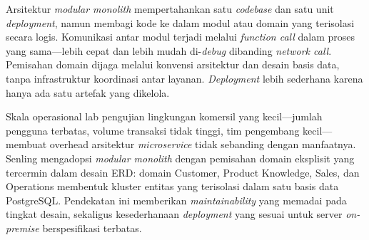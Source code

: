 Arsitektur \textit{modular monolith} mempertahankan satu \textit{codebase} dan satu unit \textit{deployment}, namun membagi kode ke dalam modul atau domain yang terisolasi secara logis. Komunikasi antar modul terjadi melalui \textit{function call} dalam proses yang sama—lebih cepat dan lebih mudah di-\textit{debug} dibanding \textit{network call}. Pemisahan domain dijaga melalui konvensi arsitektur dan desain basis data, tanpa infrastruktur koordinasi antar layanan. \textit{Deployment} lebih sederhana karena hanya ada satu artefak yang dikelola.

Skala operasional lab pengujian lingkungan komersil yang kecil—jumlah pengguna terbatas, volume transaksi tidak tinggi, tim pengembang kecil—membuat overhead arsitektur \textit{microservice} tidak sebanding dengan manfaatnya. Senling mengadopsi \textit{modular monolith} dengan pemisahan domain eksplisit yang tercermin dalam desain ERD: domain Customer, Product Knowledge, Sales, dan Operations membentuk kluster entitas yang terisolasi dalam satu basis data PostgreSQL. Pendekatan ini memberikan \textit{maintainability} yang memadai pada tingkat desain, sekaligus kesederhanaan \textit{deployment} yang sesuai untuk server \textit{on-premise} berspesifikasi terbatas.
